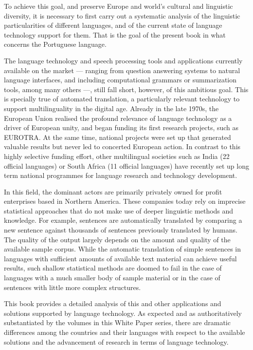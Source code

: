 \begin{multicols}{2}
To achieve this goal, and preserve Europe and world’s cultural and linguistic diversity, 
it is ne\-cessa\-ry to first carry out a systematic analysis of the linguistic particularities of different languages, 
and of the current state of language technology support for them. That is the goal
of the present book in what concerns the Portuguese language.

The language technology and speech processing tools and applications currently available on the market --- ranging from
question answering systems to natural language interfaces, and including computational grammars or summarization tools, among many others ---, 
still fall short, however, of this ambitious goal. This is specially true of automated translation, a particularly relevant techno\-lo\-gy to support multilinguality
in the digital age. Already in the late 1970s, the European Union realised the profound relevance of language technology as a driver of European unity, 
and began funding its first research projects, such as EUROTRA. At the same time, national projects were set up that generated valuable results but never led to concerted European action. 
In contrast to this highly selective funding effort, other multilingual societies such as India (22 official languages) or South Africa (11 offi\-cial languages) have recently set up long term national programmes for language research and technology development.

In this field, the dominant actors are primarily privately owned for profit enterprises based in Northern America. These companies today rely on imprecise statistical approaches that do not make use of deeper linguistic methods and knowledge. For example, sentences are automatically translated by comparing a new sentence against thousands of sentences previously translated by humans. The qua\-li\-ty of the output largely depends on the amount and quality of the available sample corpus. While the automatic translation of simple sentences in languages with sufficient amounts of available text material can achieve useful results, such shallow statistical methods are doomed to fail in the case of languages with a much smaller body of sample material or in the case of sentences with little more complex stru\-ctu\-res.

This book provides a detailed analysis of this and other applications and solutions
supported by language technology. As expected and as authoritatively substantiated by the volumes in 
this White Paper series, there are dramatic differences among the countries and their languages with respect
to the available solutions and the advancement of research in terms of language technology.


\end{multicols}
